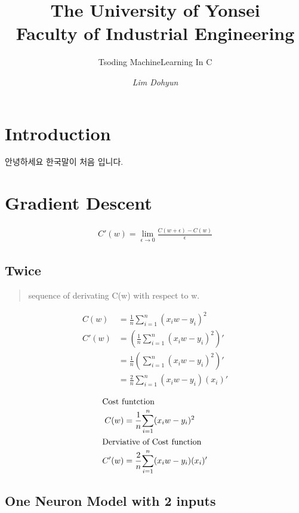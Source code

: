 \documentclass{article}
\title{\textbf{The University of Yonsei
\\{\Large Faculty of Industrial Engineering}}}
\subtitle{Tsoding MachineLearning In C}
\author{\emph{Lim Dohyun}}
\begin{document}
\maketitle
\section{Introduction}
안녕하세요 한국말이 처음 입니다.

\section{Gradient Descent}

\begin{align}
    C'(w) = \lim_{\epsilon \to 0}\frac{C(w + \epsilon) -C(w)}{\epsilon}
\end{align}

\subsection{Twice}
\begin{verse}
    sequence of derivating C(w) with respect to w.
\end{verse}
\begin{align}
   C(w) &= \frac{1}{n}{\sum_{i=1}^{n}(x_iw - y_i)^2} \\
   C'(w) &= \left(\frac{1}{n}{\sum_{i=1}^{n}(x_iw - y_i)^2}\right)' \\
   &= \frac{1}{n}\left({\sum_{i=1}^{n}(x_iw - y_i)^2}\right)' \\
   &= \frac{2}{n}{\sum_{i=1}^{n}(x_iw - y_i)(x_i)'}
\end{align}

\begin{align}
    \shortintertext{Cost funtction}
    C(w) &= \frac{1}{n}{\sum_{i=1}^{n}(x_iw - y_i)^2} \\
    \shortintertext{Derviative of Cost function}
    C'(w) &= \frac{2}{n}{\sum_{i=1}^{n}(x_iw - y_i)(x_i)'}
\end{align} 

    \bigskip

\subsection{One Neuron Model with 2 inputs}

\def\d{1.5}

\begin{center}
\end{center}
\end{document}
